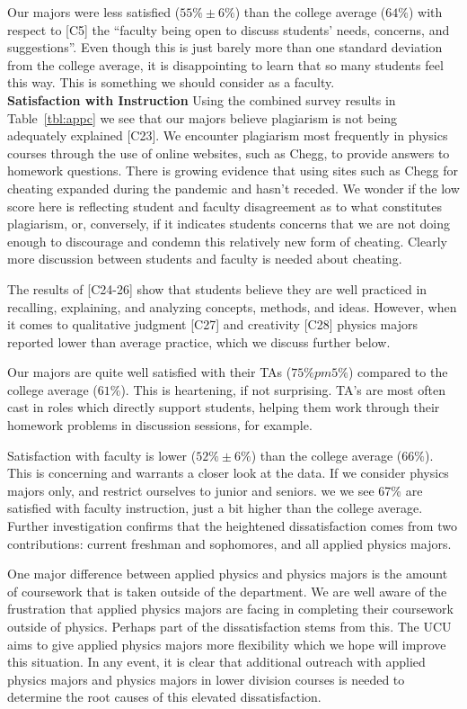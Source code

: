 \documentclass[12pt]{article}
\begin{document}
Our majors were less satisfied ($55\%\pm6\%$) than the college
average ($64\%$) with respect to [C5] the ``faculty being open to
discuss students' needs, concerns, and suggestions''.  Even though
this is just barely more than one standard deviation from the college
average, it is disappointing to learn that so many students feel this
way.  This is something we should consider as a faculty.\\[3pt]

\noindent
{\bf Satisfaction with Instruction} Using the combined survey results
in Table~\ref{tbl:appc} we see that our majors believe plagiarism is
not being adequately explained [C23].  We encounter plagiarism most
frequently in physics courses through the use of online websites, such
as Chegg, to provide answers to homework questions.  There is growing
evidence that using sites such as Chegg for cheating expanded during
the pandemic and hasn't receded.  We wonder if the low score here is
reflecting student and faculty disagreement as to what constitutes
plagiarism, or, conversely, if it indicates students concerns that we
are not doing enough to discourage and condemn this relatively new
form of cheating.  Clearly more discussion between students and
faculty is needed about cheating.

The results of [C24-26] show that students believe they are well
practiced in recalling, explaining, and analyzing concepts, methods,
and ideas.  However, when it comes to qualitative judgment [C27] and
creativity [C28] physics majors reported lower than average practice,
which we discuss further below.

Our majors are quite well satisfied with their TAs ($75\% pm 5\%$)
compared to the college average ($61\%$).  This is heartening, if not
surprising.  TA's are most often cast in roles which directly support
students, helping them work through their homework problems in
discussion sessions, for example.

Satisfaction with faculty is lower ($52\% \pm 6\%$) than the college
average ($66\%$).  This is concerning and warrants a closer look at the
data.  If we consider physics majors only, and restrict ourselves to
junior and seniors. we we see 67\% are satisfied with faculty
instruction, just a bit higher than the college average.  Further
investigation confirms that the heightened dissatisfaction comes from
two contributions: current freshman and sophomores, and all applied
physics majors.

One major difference between applied physics and physics majors is the
amount of coursework that is taken outside of the department. We
are well aware of the frustration that applied physics majors are
facing in completing their coursework outside of physics.  Perhaps
part of the dissatisfaction stems from this.  The UCU aims to give
applied physics majors more flexibility which we hope will improve
this situation.  In any event, it is clear that additional outreach
with applied physics majors and physics majors in lower division
courses is needed to determine the root causes of this elevated
dissatisfaction.\\[3pt]
\end{document}
